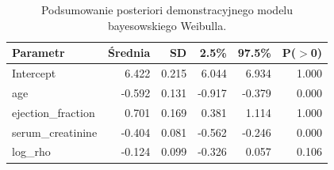 \begin{table}[htbp]
\centering
\caption{Podsumowanie posteriori demonstracyjnego modelu bayesowskiego Weibulla.}
\label{tab:bayes}
\scriptsize
\setlength{\tabcolsep}{2.4pt}
\begin{tabular*}{.98\linewidth}{@{\extracolsep{\fill}}lrrrrr}
\toprule
Parametr & Średnia & SD & 2.5\% & 97.5\% & P($>$0) \\
\midrule
Intercept & 6.422 & 0.215 & 6.044 & 6.934 & 1.000 \\
age & -0.592 & 0.131 & -0.917 & -0.379 & 0.000 \\
ejection\_fraction & 0.701 & 0.169 & 0.381 & 1.114 & 1.000 \\
serum\_creatinine & -0.404 & 0.081 & -0.562 & -0.246 & 0.000 \\
log\_rho & -0.124 & 0.099 & -0.326 & 0.057 & 0.106 \\
\bottomrule
\end{tabular*}
\end{table}
